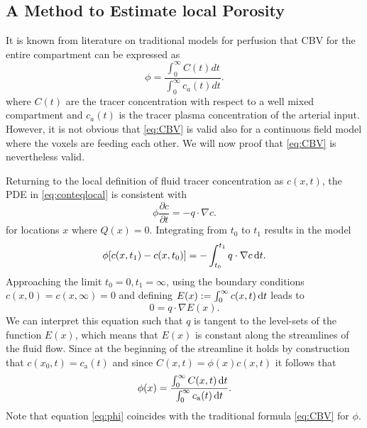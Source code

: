 \documentclass[journal,twocolumn]{IEEEtran}
\newcommand{\ca}{c_\mathrm{a}}
\begin{document}
	\subsection{A Method to Estimate local Porosity}\label{sec:CBV}
	
	It is known from literature on traditional models for perfusion that CBV for the entire compartment can be expressed as
	\begin{equation}
		\phi = \frac{\int_0^\infty C(t) dt}{\int_0^\infty c_a(t) dt}.
		\label{eq:CBV}
	\end{equation}
	where $C(t)$ are the tracer concentration with respect to a well mixed compartment and $c_a(t)$ is the tracer plasma concentration of the arterial input.
	However, it is not obvious that \eqref{eq:CBV} is valid also for a continuous field model where the voxels are feeding each other. We will now proof that \eqref{eq:CBV} is nevertheless valid.
	
	Returning to the local definition of fluid tracer concentration as $c(x,t)$, the PDE in \eqref{eq:conteqlocal} is consistent with
	\begin{equation}
		\phi\frac{\partial c}{\partial t}  = - q \cdot \nabla c.
		\label{eq:1cmodel}
	\end{equation}
	for locations $x$ where $Q(x) = 0$.
	Integrating from $t_0$ to $t_1$ results in the model
	\begin{equation}
		\phi [c(x,t_1) - c(x,t_0)]  = - \int_{t_0}^{t_1}q \cdot  \nabla c \,\mathrm{d} t.
	\end{equation}
	Approaching the limit $t_0 = 0, t_1 = \infty$, using the boundary conditions $c(x,0) = c(x,\infty) = 0$ and defining $E(x):= \int_0^\infty c(x,t) \,\mathrm{d} t$ leads to
	\begin{equation}
		0 = q \cdot \nabla  E(x).
		\label{eq:streamlinezero}
	\end{equation}
	We can interpret this equation such that $q$ is tangent to the level-sets of the function $E(x)$, which means that $E(x)$ is constant along the streamlines of the fluid flow.
	Since at the beginning of the streamline it holds by construction that $c(x_0,t) = \ca(t)$ and since $C(x,t) = \phi(x) c(x,t)$ it follows that 	
	\begin{equation}
		\phi(x) =  \frac{ \int_{0}^{\infty} C(x,t) \diffint t }{\int_{0}^{\infty} \ca(t) \diffint t}.
		\label{eq:phi}
	\end{equation}
	Note that equation \eqref{eq:phi} coincides with the traditional formula \eqref{eq:CBV} for $\phi$.
	
\end{document}
